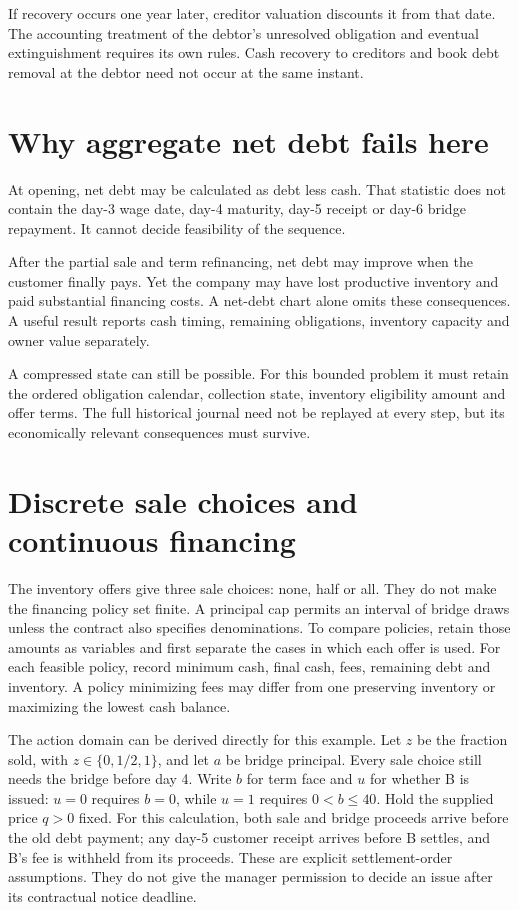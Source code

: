 If recovery occurs one year later, creditor valuation discounts it from that date. The accounting treatment of the debtor's unresolved obligation and eventual extinguishment requires its own rules. Cash recovery to creditors and book debt removal at the debtor need not occur at the same instant.

\section{Why aggregate net debt fails here}
At opening, net debt may be calculated as debt less cash. That statistic does not contain the day-3 wage date, day-4 maturity, day-5 receipt or day-6 bridge repayment. It cannot decide feasibility of the sequence.

After the partial sale and term refinancing, net debt may improve when the customer finally pays. Yet the company may have lost productive inventory and paid substantial financing costs. A net-debt chart alone omits these consequences. A useful result reports cash timing, remaining obligations, inventory capacity and owner value separately.

A compressed state can still be possible. For this bounded problem it must retain the ordered obligation calendar, collection state, inventory eligibility amount and offer terms. The full historical journal need not be replayed at every step, but its economically relevant consequences must survive.

\section{Discrete sale choices and continuous financing}
The inventory offers give three sale choices: none, half or all. They do not
make the financing policy set finite. A principal cap permits an interval of
bridge draws unless the contract also specifies denominations. To compare
policies, retain those amounts as variables and first separate the cases in
which each offer is used. For each feasible policy, record minimum cash, final
cash, fees, remaining debt and inventory. A policy minimizing fees may differ
from one preserving inventory or maximizing the lowest cash balance.

The action domain can be derived directly for this example. Let $z$ be the
fraction sold, with $z\in\{0,1/2,1\}$, and let $a$ be bridge principal. Every
sale choice still needs the bridge before day 4. Write $b$ for term face and
$u$ for whether B is issued: $u=0$ requires $b=0$, while $u=1$ requires
$0<b\leq40$. Hold the supplied price $q>0$ fixed. For this calculation, both
sale and bridge proceeds arrive before the old debt payment; any day-5 customer
receipt arrives before B settles, and B's fee is withheld from its proceeds.
These are explicit settlement-order assumptions. They do not give the manager
permission to decide an issue after its contractual notice deadline.

